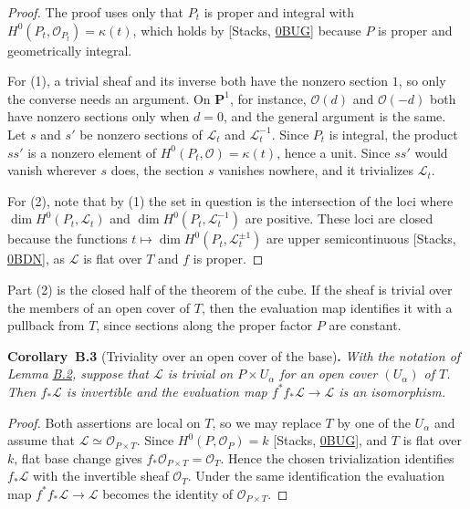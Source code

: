 \documentclass[11pt]{article}
\newenvironment{bpstatement}[2]{\par\addvspace{0.6\baselineskip}\noindent\textbf{#1}#2\textbf{.}\enspace\ignorespaces}
  {\par\addvspace{0.4\baselineskip}}
\newenvironment{bpstatementit}[2]{\begin{bpstatement}{#1}{#2}\itshape\ignorespaces}{\end{bpstatement}}
\begin{document}
\begin{proof}[{Proof}]\label{bp7}%
The proof uses only that \(P_t\) is proper and integral with \(H^0(P_t,\mathcal O_{P_t})=\kappa(t)\), which holds by [Stacks, \href{https://stacks.math.columbia.edu/tag/0BUG}{0BUG}] because \(P\) is proper and geometrically integral.

For (1), a trivial sheaf and its inverse both have the nonzero section \(1\), so only the converse needs an argument. On \(\mathbf P^1\), for instance, \(\mathcal O(d)\) and \(\mathcal O(-d)\) both have nonzero sections only when \(d=0\), and the general argument is the same. Let \(s\) and \(s'\) be nonzero sections of \(\mathcal L_t\) and \(\mathcal L_t^{-1}\). Since \(P_t\) is integral, the product \(ss'\) is a nonzero element of \(H^0(P_t,\mathcal O)=\kappa(t)\), hence a unit. Since \(ss'\) would vanish wherever \(s\) does, the section \(s\) vanishes nowhere, and it trivializes \(\mathcal L_t\).

For (2), note that by (1) the set in question is the intersection of the loci where \(\dim H^0(P_t,\mathcal L_t)\) and \(\dim H^0(P_t,\mathcal L_t^{-1})\) are positive. These loci are closed because the functions \(t\mapsto\dim H^0(P_t,\mathcal L_t^{\pm1})\) are upper semicontinuous [Stacks, \href{https://stacks.math.columbia.edu/tag/0BDN}{0BDN}], as \(\mathcal L\) is flat over \(T\) and \(f\) is proper.
\end{proof}

\label{bp8}%
Part (2) is the closed half of the theorem of the cube. If the sheaf is trivial over the members of an open cover of \(T\), then the evaluation map identifies it with a pullback from \(T\), since sections along the proper factor \(P\) are constant.

\label{bp9}%
\begin{bpstatementit}{Corollary~B.3}{ (Triviality over an open cover of the base)}
With the notation of Lemma \hyperref[bp6]{B.2}, suppose that \(\mathcal L\) is trivial on \(P\times U_\alpha\) for an open cover \((U_\alpha)\) of \(T\). Then \(f_*\mathcal L\) is invertible and the evaluation map \(f^*f_*\mathcal L\to\mathcal L\) is an isomorphism.
\end{bpstatementit}

\begin{proof}[{Proof}]\label{bp10}%
Both assertions are local on \(T\), so we may replace \(T\) by one of the \(U_\alpha\) and assume that \(\mathcal L\simeq\mathcal O_{P\times T}\). Since \(H^0(P,\mathcal O_P)=k\) [Stacks, \href{https://stacks.math.columbia.edu/tag/0BUG}{0BUG}], and \(T\) is flat over \(k\), flat base change gives \(f_*\mathcal O_{P\times T}=\mathcal O_T\). Hence the chosen trivialization identifies \(f_*\mathcal L\) with the invertible sheaf \(\mathcal O_T\). Under the same identification the evaluation map \(f^*f_*\mathcal L\to\mathcal L\) becomes the identity of \(\mathcal O_{P\times T}\).
\end{proof}
\end{document}
